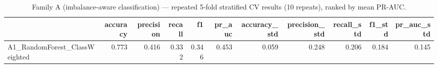 \begin{table}[htbp]
\caption{Family A (imbalance-aware classification) — repeated 5-fold stratified CV results (10 repeats), ranked by mean PR-AUC.}
\label{tab:family_a_cv_summary}
\begin{tabular}{lrrrrrrrrrr}
\toprule
 & accuracy & precision & recall & f1 & pr\_auc & accuracy\_std & precision\_std & recall\_std & f1\_std & pr\_auc\_std \\
\midrule
A1\_RandomForest\_ClassWeighted & 0.773 & 0.416 & 0.332 & 0.346 & 0.453 & 0.059 & 0.248 & 0.206 & 0.184 & 0.145 \\
\bottomrule
\end{tabular}
\end{table}
